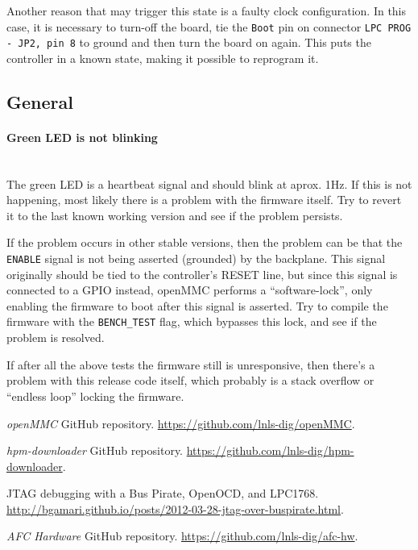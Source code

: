 \documentclass[letterpaper,12pt, titlepage]{article}
\newcommand{\newparagraph}[1]{\paragraph{#1}\mbox{}\\}
\begin{document}
Another reason that may trigger this state is a faulty clock configuration. In this case, it is necessary to turn-off the board, tie the \texttt{Boot} pin on connector \texttt{LPC PROG - JP2, pin 8} to ground and then turn the board on again. This puts the controller in a known state, making it possible to reprogram it.

\subsection{General}

\newparagraph{Green LED is not blinking}
The green LED is a heartbeat signal and should blink at aprox. 1Hz. If this is not happening, most likely there is a problem with the firmware itself. Try to revert it to the last known working version and see if the problem persists.

If the problem occurs in other stable versions, then the problem can be that the \texttt{ENABLE} signal is not being asserted (grounded) by the backplane. This signal originally should be tied to the controller's RESET line, but since this signal is connected to a GPIO instead, openMMC performs a ``software-lock'', only enabling the firmware to boot after this signal is asserted. Try to compile the firmware with the \texttt{BENCH\_TEST} flag, which bypasses this lock, and see if the problem is resolved.

If after all the above tests the firmware still is unresponsive, then there's a problem with this release code itself, which probably is a stack overflow or ``endless loop'' locking the firmware.

\newpage
\begin{thebibliography}{99}

 \emph{openMMC} GitHub repository. \url{https://github.com/lnls-dig/openMMC}.

 \emph{hpm-downloader} GitHub repository. \url{https://github.com/lnls-dig/hpm-downloader}.

 JTAG debugging with a Bus Pirate, OpenOCD, and LPC1768. \url{http://bgamari.github.io/posts/2012-03-28-jtag-over-buspirate.html}.

 \emph{AFC Hardware} GitHub repository. \url{https://github.com/lnls-dig/afc-hw}.

\end{thebibliography}
\end{document}

